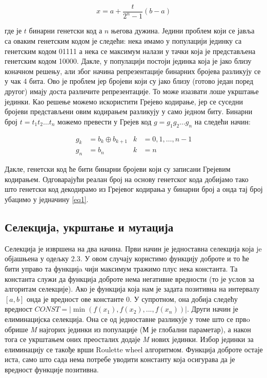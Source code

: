 \documentclass{article}
\begin{document}
\begin{equation} \label{eq1}
    x = a + \frac{t}{2^n - 1} (b - a)
\end{equation}

где је $t$ бинарни генетски код а $n$ његова дужина. Једини проблем који се јавља са оваким
генетским кодом је следећи: нека имамо у популацији јединку са генетским кодом 01111 а нека се максимум
налази у тачки која је представљена генетским кодом 10000. Дакле, у популацији постоји
јединка која је јако близу коначном решењу, али због начина репрезентације бинарних 
бројева разликују се у чак 4 бита. Ово је проблем јер бројеви који су јако близу 
(готово један поред другог) имају доста различите репрезентације. То може изазвати лоше укрштање јединки. 
Као решење можемо искористити Грејево кодирање, јер се суседни бројеви представљени овим кодирањем 
разликују у само једном биту. Бинарни број $t = t_1 t_2 \dots t_n$ можемо превести у 
Грејев код $g = g_1 g_2 \dots g_n$ на следећи начин: 

\begin{align*}
    g_k &= b_k \oplus b_{k + 1} & k &= 0, 1, \dots, n - 1 \\
    g_n &= b_n                   &   k &= n
\end{align*}

Дакле, генетски код ће бити бинарни бројеви који су записани Грејевим кодирањем. 
Одговарајући реалан број на основу генетског кода добијамо тако што генетски код 
декодирамо из Грејевог кодирања у бинарни број а онда тај број убацимо у једначину \ref*{eq1}.

\subsection{Селекција, укрштање и мутација}
Селекција је извршена на два начина. Први начин је једноставна селекција која je
објашњена у одељку 2.3. У овом случају користимо функцију доброте и то ће бити управо 
та функцијa чији максимум тражимо плус нека константа. Та константа служи да функција доброте
нема негативне вредности (то је услов за алгоритам селекције). 
Ако је функција која нам је задата позитивна на интервалу $[a, b]$ онда је вредност 
ове константе 0. У супротном, она добија следећу вредност $CONST = |\min(f(x_1), f(x_2), ..., f(x_n))|$.
Други начин је елиминацијска селекција. Она се од једноставне разликује у томе што се првo
обрише \textit{M} најгорих јединки из популације (М је глобални параметар), а након тога се укрштањем оних преосталих додаје
\textit{M} нових јединки. Избор јединки за елиминацију се такође врши Roulette wheel алгоритмом.
Функција доброте остаје иста, само што сада нема потребе уводити константу која осигурава да је вредност функције позитивна.
\end{document}
